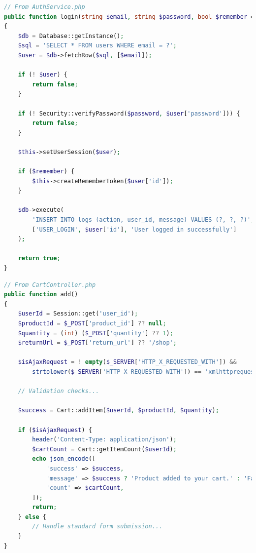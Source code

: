 \documentclass{article}
\begin{document}
\begin{lstlisting}[language=PHP, caption=User authentication with session management]
// From AuthService.php
public function login(string $email, string $password, bool $remember = false): bool
{
    $db = Database::getInstance();
    $sql = 'SELECT * FROM users WHERE email = ?';
    $user = $db->fetchRow($sql, [$email]);

    if (! $user) {
        return false;
    }

    if (! Security::verifyPassword($password, $user['password'])) {
        return false;
    }

    $this->setUserSession($user);

    if ($remember) {
        $this->createRememberToken($user['id']);
    }

    $db->execute(
        'INSERT INTO logs (action, user_id, message) VALUES (?, ?, ?)',
        ['USER_LOGIN', $user['id'], 'User logged in successfully']
    );

    return true;
}
\end{lstlisting}

\begin{lstlisting}[language=PHP, caption=Shopping cart functionality]
// From CartController.php
public function add()
{
    $userId = Session::get('user_id');
    $productId = $_POST['product_id'] ?? null;
    $quantity = (int) ($_POST['quantity'] ?? 1);
    $returnUrl = $_POST['return_url'] ?? '/shop';

    $isAjaxRequest = ! empty($_SERVER['HTTP_X_REQUESTED_WITH']) &&
        strtolower($_SERVER['HTTP_X_REQUESTED_WITH']) == 'xmlhttprequest';

    // Validation checks...
    
    $success = Cart::addItem($userId, $productId, $quantity);

    if ($isAjaxRequest) {
        header('Content-Type: application/json');
        $cartCount = Cart::getItemCount($userId);
        echo json_encode([
            'success' => $success,
            'message' => $success ? 'Product added to your cart.' : 'Failed to add product to cart.',
            'count' => $cartCount,
        ]);
        return;
    } else {
        // Handle standard form submission...
    }
}
\end{lstlisting}
\end{document}
